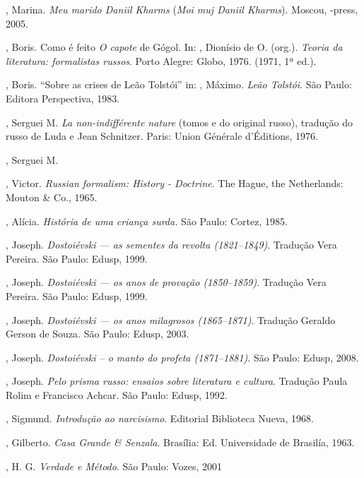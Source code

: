 \begin{Parskip}
, Marina. \emph{Meu marido Daniil Kharms} (\emph{Moi muj Daniil Kharms}). Moscou, -press, 2005.

, Boris. Como é feito \emph{O capote} de Gógol. In: , Dionísio de O. (org.). \emph{Teoria da literatura: formalistas russos}. Porto Alegre: Globo, 1976. (1971, 1ª ed.).

, Boris. ``Sobre as crises de Leão Tolstói'' in: ,
Máximo. \emph{Leão Tolstói}. São Paulo: Editora Perspectiva, 1983.

, Serguei M. \emph{La non-indifférente nature } (tomos 
e  do original russo), tradução do russo de Luda e Jean Schnitzer.
Paris: Union Générale d'Éditions, 1976.

, Serguei M. {}

, Victor. \emph{Russian formalism: History - Doctrine}. The Hague,
the Netherlands: Mouton \& Co., 1965.

, Alícia. \emph{História de uma criança surda.} São Paulo: Cortez, 1985.

, Joseph. \emph{Dostoiévski --- as sementes da revolta (1821--1849)}. Tradução Vera Pereira. São Paulo: Edusp, 1999.

, Joseph. \emph{Dostoiévski --- os anos de provação (1850--1859)}. Tradução Vera Pereira. São Paulo: Edusp, 1999.

, Joseph. \emph{Dostoiévski --- os anos milagrosos (1865--1871)}. Tradução Geraldo Gerson de Souza. São Paulo: Edusp, 2003.

, Joseph. \emph{Dostoiévski -- o manto do profeta (1871--1881)}. São Paulo: Edusp, 2008.

, Joseph. \emph{Pelo prisma russo: ensaios sobre literatura e cultura}. Tradução Paula Rolim e Francisco Achcar. São Paulo: Edusp, 1992.

, Sigmund. \emph{Introdução ao narcisismo}. Editorial Biblioteca
Nueva, 1968.

, Gilberto. \emph{Casa Grande \& Senzala}. Brasília: Ed.
Universidade de Brasilía, 1963.

, H. G. \emph{Verdade e Método}. São Paulo: Vozes, 2001


\end{Parskip}
